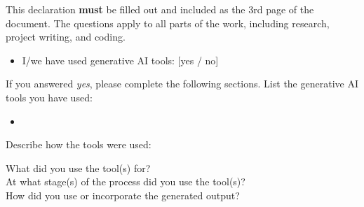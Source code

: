 \documentclass[10pt,a4paper]{article}
\begin{document}
This declaration \textbf{must} be filled out and included as the 3rd page of the document. The questions apply to all parts of the work, including research, project writing, and coding.
\begin{itemize}
\item I/we have used generative AI tools: [yes / no]
\end{itemize}
If you answered \emph{yes}, please complete the following sections. List the generative AI tools you have used:
\begin{itemize}
\item
\end{itemize}
Describe how the tools were used:
\begin{description}
\item[What did you use the tool(s) for?]
\item[At what stage(s) of the process did you use the tool(s)?]
\item[How did you use or incorporate the generated output?]
\end{description}

\newpage



\end{document}
